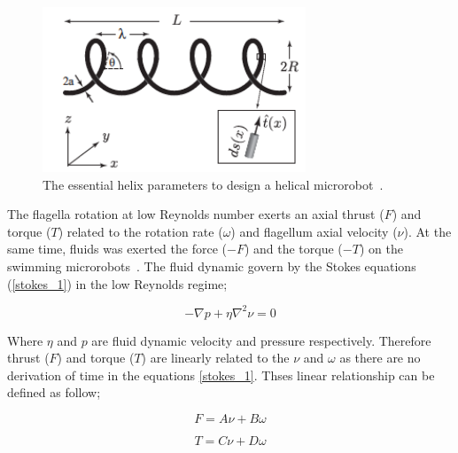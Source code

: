 \documentclass[12pt,a4paper,titlepage]{report}
\begin{document}
\begin{figure}
  \centering
    \includegraphics[width=0.7\textwidth]{parameters}
  \caption[Helix parameters]{The essential helix parameters to design a helical microrobot~\citep{rodenborn2013propulsion}.}
  \label{parameters}
\end{figure}



The flagella rotation at low Reynolds number exerts an axial thrust ($F$) and torque ($T$) related to the
rotation rate ($\omega$) and flagellum axial velocity ($\nu$). At the same time, fluids was exerted the force
 ($-F$) and the torque ($-T$) on the swimming microrobots~\citep{purcell1997efficiency}. The fluid dynamic 
govern by the Stokes equations (\ref{stokes_1}) in the low Reynolds regime;


\begin{equation}
  -\nabla{p}+ \eta\nabla^2{\nu}  = 0
\label{stokes_1}
\end{equation}

Where $\eta$ and $p$ are fluid dynamic velocity and pressure respectively. Therefore thrust ($F$) and 
torque ($T$) are linearly related to the $\nu$ and $\omega$ as there are no derivation of time in 
the equations \ref{stokes_1}. Thses linear relationship can be defined as follow;



\begin{equation}
  F  = A\nu + B\omega
\label{linear1}
\end{equation}

\begin{equation}
  T = C\nu + D\omega
\label{linear2}
\end{equation}
\end{document}
